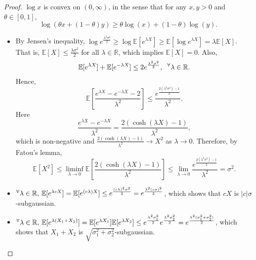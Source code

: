 \documentclass[10pt]{article}
\theoremstyle{definition}
\begin{document}
\begin{proof}
    \leavevmode
    $\log x$ is convex on $(0, \infty)$, in the sense that for any $x, y > 0$ and $\theta \in [0, 1]$,
    \begin{equation*}
        \log(\theta x + (1-\theta)y) \geq \theta \log(x) + (1-\theta) \log(y).
    \end{equation*}
    \begin{itemize}
        \item[(a)] By Jensen's inequality, $\log e^{\frac{\lambda^2 \sigma^2}{2}} \geq \log \mathbb{E}[e^{\lambda X}] \geq \mathbb{E}[\log e^{\lambda X}] = \lambda \mathbb{E}[X]$. 
        That is, $\mathbb{E}[X] \leq \frac{\lambda \sigma^2}{2}$ for all $\lambda \in \mathbb{R}$, which implies $\mathbb{E}[X] = 0$. 
        Also,
        \begin{equation*}
            \mathbb{E}[e^{\lambda X}] + \mathbb{E}[e^{-\lambda X}] \leq 2 e^{\frac{\lambda^2 \sigma^2}{2}}, \hspace{0.2cm} ^\forall \lambda \in \mathbb{R}.
        \end{equation*}
        Hence,
        \begin{equation*}
            \mathbb{E}\left[\frac{e^{\lambda X} - e^{-\lambda X} - 2}{\lambda^2}\right] \leq \frac{e^{\frac{2(\lambda^2 \sigma^2) - 1}{2}}}{\lambda^2}.
        \end{equation*}
        Here
        \begin{equation*}
            \frac{e^{\lambda X} - e^{-\lambda X}}{\lambda^2} = \frac{2(\cosh(\lambda X) - 1)}{\lambda^2},
        \end{equation*}
        which is non-negative and $\frac{2(\cosh(\lambda X) - 1)}{\lambda^2} \to X^2$ as $\lambda \to 0$.
        Therefore, by Fatou's lemma,
        \begin{equation*}
            \mathbb{E}[X^2] \leq \liminf_{\lambda \to 0} \mathbb{E}\left[\frac{2(\cosh(\lambda X) - 1)}{\lambda^2}\right] \leq \lim_{\lambda \to 0} \frac{e^{\frac{2(\lambda^2 \sigma^2) - 1}{2}}}{\lambda^2} = \sigma^2.
        \end{equation*}
        \item[(b)] $^\forall \lambda \in \mathbb{R}, \hspace{0.2em} \mathbb{E}[e^{\lambda cX}] = \mathbb{E}[e^{(c\lambda) X}] \leq e^{\frac{(c\lambda)^2 \sigma^2}{2}} = e^{\frac{\lambda^2 (c\sigma)^2}{2}}$, which shows that $cX$ is $|c|\sigma$-subgaussian.
        \item[(c)] $^\forall \lambda \in \mathbb{R}, \hspace{0.2em} \mathbb{E}[e^{\lambda (X_1 + X_2)}] = \mathbb{E}[e^{\lambda X_1}] \mathbb{E}[e^{\lambda X_2}] \leq e^{\frac{\lambda^2 \sigma_1^2}{2}} e^{\frac{\lambda^2 \sigma_2^2}{2}} = e^{\frac{\lambda^2 (\sigma_1^2 + \sigma_2^2)}{2}}$, which shows that $X_1 + X_2$ is $\sqrt{\sigma_1^2 + \sigma_2^2}$-subgaussian.
    \end{itemize}
\end{proof}
\end{document}
